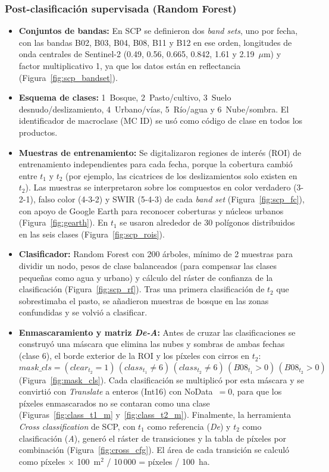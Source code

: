 \documentclass[12pt]{article}
\begin{document}
\subsubsection{Post-clasificación supervisada (Random Forest)}
\begin{itemize}
    \item \textbf{Conjuntos de bandas:} En SCP se definieron dos \emph{band sets}, uno por fecha, con las bandas B02, B03, B04, B08, B11 y B12 en ese orden, longitudes de onda centrales de Sentinel-2 (0.49, 0.56, 0.665, 0.842, 1.61 y 2.19~$\mu$m) y factor multiplicativo 1, ya que los datos están en reflectancia (Figura~\ref{fig:scp_bandset}).
    \item \textbf{Esquema de clases:} 1~Bosque, 2~Pasto/cultivo, 3~Suelo desnudo/deslizamiento, 4~Urbano/vías, 5~Río/agua y 6~Nube/sombra. El identificador de macroclase (MC ID) se usó como código de clase en todos los productos.
    \item \textbf{Muestras de entrenamiento:} Se digitalizaron regiones de interés (ROI) de entrenamiento independientes para cada fecha, porque la cobertura cambió entre $t_1$ y $t_2$ (por ejemplo, las cicatrices de los deslizamientos solo existen en $t_2$). Las muestras se interpretaron sobre los compuestos en color verdadero (3-2-1), falso color (4-3-2) y SWIR (5-4-3) de cada \emph{band set} (Figura~\ref{fig:scp_fc}), con apoyo de Google Earth para reconocer coberturas y núcleos urbanos (Figura~\ref{fig:gearth}). En $t_1$ se usaron alrededor de 30 polígonos distribuidos en las seis clases (Figura~\ref{fig:scp_rois}).
    \item \textbf{Clasificador:} Random Forest \parencite{Breiman2001} con 200 árboles, mínimo de 2 muestras para dividir un nodo, pesos de clase balanceados (para compensar las clases pequeñas como agua y urbano) y cálculo del ráster de confianza de la clasificación (Figura~\ref{fig:scp_rf}). Tras una primera clasificación de $t_2$ que sobrestimaba el pasto, se añadieron muestras de bosque en las zonas confundidas y se volvió a clasificar.
    \item \textbf{Enmascaramiento y matriz \emph{De-A}:} Antes de cruzar las clasificaciones se construyó una máscara que elimina las nubes y sombras de ambas fechas (clase 6), el borde exterior de la ROI y los píxeles con cirros en $t_2$:
    \[
    mask\_cls = (clear_{t_2} = 1)\,(class_{t_1} \neq 6)\,(class_{t_2} \neq 6)\,(B08_{t_1} > 0)\,(B08_{t_2} > 0)
    \]
    (Figura~\ref{fig:mask_cls}). Cada clasificación se multiplicó por esta máscara y se convirtió con \emph{Translate} a enteros (Int16) con NoData~$=0$, para que los píxeles enmascarados no se contaran como una clase (Figuras~\ref{fig:class_t1_m} y~\ref{fig:class_t2_m}). Finalmente, la herramienta \emph{Cross classification} de SCP, con $t_1$ como referencia (\emph{De}) y $t_2$ como clasificación (\emph{A}), generó el ráster de transiciones y la tabla de píxeles por combinación (Figura~\ref{fig:cross_cfg}). El área de cada transición se calculó como píxeles $\times$ 100~m$^2$ / 10\,000 = píxeles / 100~ha.
\end{itemize}
\end{document}
